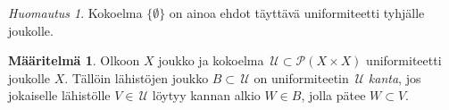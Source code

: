 \documentclass[12pt,a4paper,leqno]{report}
\newcommand{\U}{\,\mathcal{U}}
\newcommand{\Pot}{\mathcal{P}}
\theoremstyle{plain}
\newtheorem{kor}[equation]{Korollaari}
\theoremstyle{definition}
\newtheorem{maar}[equation]{Määritelmä}
\theoremstyle{remark}
\newtheorem{huom}[equation]{Huomautus}
\begin{document}
\begin{huom}
Kokoelma $\{\emptyset\}$ on ainoa ehdot täyttävä uniformiteetti tyhjälle joukolle.
\end{huom}
\begin{maar}\label{uniformi_kanta}
Olkoon $X$ joukko ja kokoelma $\U\subset \Pot (X\times X)$ uniformiteetti 
joukolle $X$. Tällöin lähistöjen joukko $B\subset \U$ on 
uniformiteetin $\U$ \emph{kanta}, jos jokaiselle lähistölle $V\in\U$ löytyy 
kannan alkio $W\in B$, jolla pätee $W\subset V$.
\end{maar}
\end{document}
